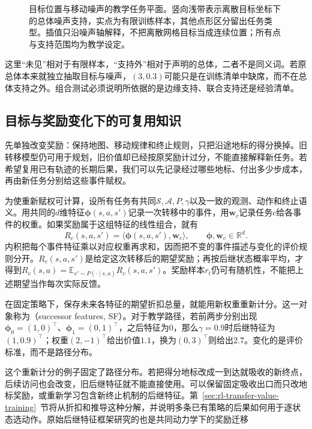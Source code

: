 \begin{figure}[htbp]
  \centering
  
  \caption{目标位置与移动噪声的教学任务平面。竖向浅带表示离散目标坐标下的总体噪声支持，实点为有限训练样本，其他点形区分留出任务类型。插值只沿噪声轴解释，不把离散网格目标当成连续位置；所有点与支持范围均为教学设定。}
  \label{fig:rl-transfer-task-plane}
\end{figure}

这里“未见”相对于有限样本，“支持外”相对于声明的总体，二者不是同义词。若原总体本来就独立抽取目标与噪声，$(3,0.3)$可能只是在训练清单中缺席，而不在总体支持之外。组合测试必须说明所依据的是边缘支持、联合支持还是经验清单。

\subsection{目标与奖励变化下的可复用知识}
\label{sec:rl-transfer-reward-change}

先单独改变奖励：保持地图、移动规律和终止规则，只把沿途地标的得分换掉。旧转移模型仍可用于规划，旧价值却已经按原奖励计过分，不能直接解释新任务。若希望复用已有轨迹的长期后果，我们可以先记录经过哪些地标、付出多少步成本，再由新任务分别给这些事件赋权。

为使重新赋权可计算，设所有任务有共同$\mathcal S,\mathcal A,P,\gamma$以及一致的观测、动作和终止语义。用共同的$d$维特征$\bm\phi(s,a,s')$记录一次转移中的事件，用$\bm w_c$记录任务$c$给各事件的权重。如果奖励属于这组特征的线性组合，就有
\begin{equation}
  R_c(s,a,s')=\langle\bm\phi(s,a,s'),\bm w_c\rangle,
  \qquad \bm\phi,\bm w_c\in\mathbb R^d.
  \label{eq:rl-transfer-linear-reward}
\end{equation}
内积把每个事件特征乘以对应权重再求和，因而把不变的事件描述与变化的评价规则分开。$R_c(s,a,s')$是给定这次转移后的期望奖励；再按后继状态概率平均，才得到$R_c(s,a)=\mathbb E_{s'\sim P(\cdot\mid s,a)}R_c(s,a,s')$。奖励样本$r_t$仍可有随机性，不能把上述期望当作每次实际反馈。

在固定策略下，保存未来各特征的期望折扣总量，就能用新权重重新计分。这一对象称为（successor features, SF）。对于教学路径，若前两步分别出现$\bm\phi_0=(1,0)^\top$、$\bm\phi_1=(0,1)^\top$，之后特征为0，那么$\gamma=0.9$时后继特征为$(1,0.9)^\top$；权重$(2,-1)^\top$给出价值$1.1$，换为$(0,3)^\top$则给出$2.7$。变化的是评价标准，而不是路径分布。

这个重新计分的例子固定了路径分布。若把得分地标改成一到达就吸收的新终点，后续访问也会改变，旧后继特征就不能直接使用。可以保留固定吸收出口而只改地标奖励，或重新学习包含新终止机制的后继特征。第~\ref{sec:rl-transfer-value-training}~节将从折扣和推导这种分解，并说明多条已有策略的后果如何用于逐状态选动作。原始后继特征框架研究的也是共同动力学下的奖励迁移

